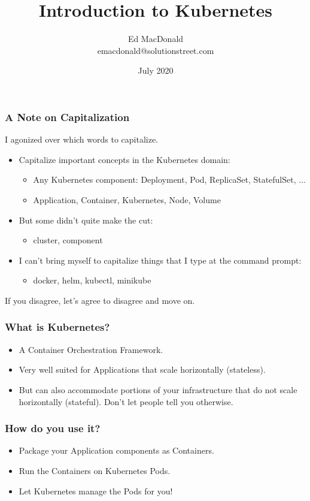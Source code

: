 \documentclass{beamer}
\title[Kubernetes]{Introduction to Kubernetes}
\author[Ed MacDonald]{Ed MacDonald\\emacdonald@solutionstreet.com}
\institute[\href{https://solutionstreet.com}{SolutionStreet}]{SolutionStreet\\\href{https://solutionstreet.com}{(solutionstreet.com)}}
\date{July 2020}
\begin{document}
\frame{\titlepage}

\begin{frame}
\frametitle{A Note on Capitalization}

I agonized over which words to capitalize.

\begin{itemize}
   \item{Capitalize important concepts in the Kubernetes domain:}
   \begin{itemize}
      \item{Any Kubernetes component: Deployment, Pod, ReplicaSet, StatefulSet, ...}
      \item{Application, Container, Kubernetes, Node, Volume}
   \end{itemize}

   \item{But some didn't quite make the cut:}
   \begin{itemize}
      \item{cluster, component}
   \end{itemize}

   \item{I can't bring myself to capitalize things that I type at the command prompt:}
   \begin{itemize}
      \item{docker, helm, kubectl, minikube}
   \end{itemize}
\end{itemize}

If you disagree, let's agree to disagree and move on.

\end{frame}

\begin{frame}
\frametitle{What is Kubernetes?}
\begin{itemize}
    \item{A Container Orchestration Framework.}
    \item{Very well suited for Applications that scale horizontally (stateless).}
    \item{But can also accommodate portions of your infrastructure that do not scale horizontally (stateful). Don't let people tell you otherwise.}
\end{itemize}
\end{frame}

\begin{frame}
    \frametitle{How do you use it?}
    \begin{itemize}
        \item{Package your Application components as Containers.}
        \item{Run the Containers on Kubernetes Pods.}
        \item{Let Kubernetes manage the Pods for you!}
    \end{itemize}
\end{frame}
\end{document}
